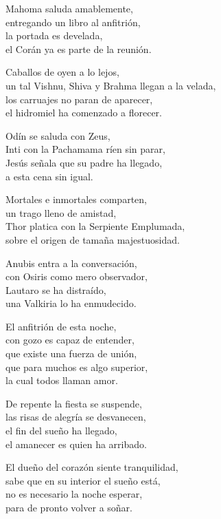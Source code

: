 \begin{center}
\vspace{1em} 
Mahoma saluda amablemente,\\ 
entregando un libro al anfitrión,\\ 
la portada es develada,\\ 
el Corán ya es parte de la reunión.

\vspace{1em} 
Caballos de oyen a lo lejos,\\ 
un tal Vishnu, Shiva y Brahma llegan a la velada,\\ 
los carruajes no paran de aparecer,\\ 
el hidromiel ha comenzado a florecer.

\vspace{1em} 
Odín se saluda con Zeus,\\ 
Inti con la Pachamama ríen sin parar,\\ 
Jesús señala que su padre ha llegado,\\ 
a esta cena sin igual.

\vspace{1em} 
Mortales e inmortales comparten,\\ 
un trago lleno de amistad,\\ 
Thor platica con la Serpiente Emplumada,\\ 
sobre el origen de tamaña majestuosidad.

\vspace{1em} 
Anubis entra a la conversación,\\ 
con Osiris como mero observador,\\ 
Lautaro se ha distraído,\\ 
una Valkiria lo ha enmudecido.

\vspace{1em} 
El anfitrión de esta noche,\\ 
con gozo es capaz de entender,\\ 
que existe una fuerza de unión,\\ 
que para muchos es algo superior,\\ 
la cual todos llaman amor.

\vspace{3em} 
De repente la fiesta se suspende,\\ 
las risas de alegría se desvanecen,\\ 
el fin del sueño ha llegado,\\ 
el amanecer es quien ha arribado.

\vspace{1em} 
El dueño del corazón siente tranquilidad,\\ 
sabe que en su interior el sueño está,\\ 
no es necesario la noche esperar,\\ 
para de pronto volver a soñar.


\end{center}




